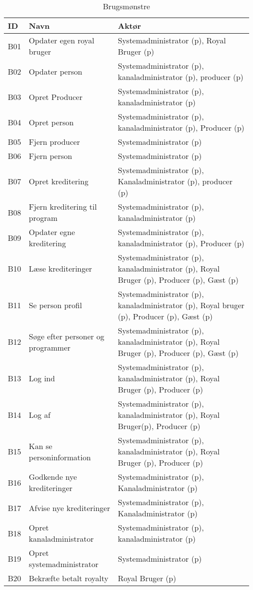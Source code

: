\begin{table}[H]
\centering

\begin{tabular}{ |p{1cm}|p{3.5cm}|p{11.5cm}| }
\hline
ID & Navn & Aktør \\
\hline
B01 & Opdater egen royal bruger & Systemadministrator (p), Royal Bruger (p) \\
\hline
B02 & Opdater person & Systemadministrator (p), kanaladministrator (p), producer (p) \\
\hline
B03 & Opret Producer & Systemadministrator (p), kanaladministrator (p) \\
\hline
B04 & Opret person & Systemadministrator (p), kanaladministrator (p), Producer (p) \\
\hline
B05 & Fjern producer & Systemadministrator (p) \\
\hline
B06 & Fjern person & Systemadministrator (p) \\
\hline
B07 & Opret kreditering & Systemadministrator (p), Kanaladministrator (p), producer (p) \\
\hline
B08 & Fjern kreditering til program & Systemadministrator (p), kanaladministrator (p) \\
\hline
B09 & Opdater egne kreditering & Systemadministrator (p), kanaladministrator (p), Producer (p) \\
\hline
B10 & Læse krediteringer & Systemadministrator (p), kanaladministrator (p), Royal Bruger (p), Producer (p), Gæst (p) \\
\hline
B11 & Se person profil & Systemadministrator (p), kanaladministrator (p), Royal bruger (p), Producer (p), Gæst (p) \\
\hline
B12 & Søge efter personer og programmer & Systemadministrator (p), kanaladministrator (p), Royal Bruger (p), Producer (p), Gæst (p) \\
\hline
B13 & Log ind & Systemadministrator (p), kanaladministrator (p), Royal Bruger (p), Producer (p) \\
\hline
B14 & Log af & Systemadministrator (p), kanaladministrator (p), Royal Bruger(p), Producer (p) \\
\hline
B15 & Kan se personinformation & Systemadministrator (p), kanaladministrator (p), Royal Bruger (p), Producer (p) \\
\hline
B16 & Godkende nye krediteringer & Systemadministrator (p), Kanaladministrator (p) \\
\hline
B17 & Afvise nye krediteringer & Systemadministrator (p), Kanaladministrator (p) \\
\hline
B18 & Opret kanaladministrator & Systemadministrator (p), kanaladministrator (p) \\
\hline
B19 & Opret systemadministrator & Systemadministrator (p) \\
\hline
B20 & Bekræfte betalt royalty & Royal Bruger (p) \\
\hline
\end{tabular}
\caption{Brugsmønstre}
\label{tab:brugsmønstre}
\end{table}

